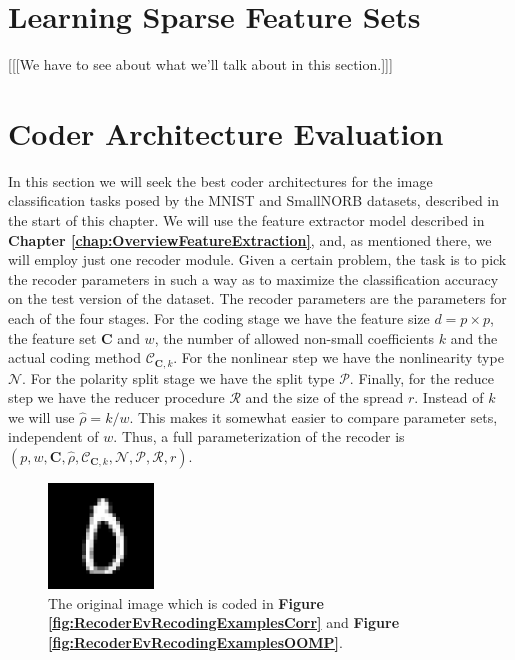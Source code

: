\documentclass[12pt,a4paper,oneside,english]{UPBThesis}
\newcommand{\hctimes}[2]{{#1}\!\times\!{#2}}
\begin{document}
\section{Learning Sparse Feature Sets}
\label{sec:LearningSparseFeatureSet}

[[[We have to see about what we'll talk about in this section.]]]

\section{Coder Architecture Evaluation}
\label{sec:CoderArchitectureEvaluation}

In this section we will seek the best coder architectures for the image classification tasks posed by the MNIST and SmallNORB datasets, described in the start of this chapter. We will use the feature extractor model described in \textbf{Chapter \ref{chap:OverviewFeatureExtraction}}, and, as mentioned there, we will employ just one recoder module. Given a certain problem, the task is to pick the recoder parameters in such a way as to maximize the classification accuracy on the test version of the dataset. The recoder parameters are the parameters for each of the four stages. For the coding stage we have the feature size $d = \hctimes{p}{p}$, the feature set $\textbf{C}$ and $w$, the number of allowed non-small coefficients $k$ and the actual coding method $\mathcal{C}_{\textbf{C},k}$. For the nonlinear step we have the nonlinearity type $\mathcal{N}$. For the polarity split stage we have the split type $\mathcal{P}$. Finally, for the reduce step we have the reducer procedure $\mathcal{R}$ and the size of the spread $r$. Instead of $k$ we will use $\hat{\rho} = k/w$. This makes it somewhat easier to compare parameter sets, independent of $w$. Thus, a full parameterization of the recoder is $(p,w,\textbf{C},\hat{\rho},\mathcal{C}_{\textbf{C},k},\mathcal{N},\mathcal{P},\mathcal{R},r)$.

\begin{figure}
\begin{center}
\includegraphics[width=0.25\textwidth]{thesis_data/recoderev/original_image.png}
\end{center}
\caption{The original image which is coded in \textbf{Figure \ref{fig:RecoderEvRecodingExamplesCorr}} and \textbf{Figure \ref{fig:RecoderEvRecodingExamplesOOMP}}.}
\label{fig:RecoderEvOriginalImage}
\end{figure}
\end{document}
